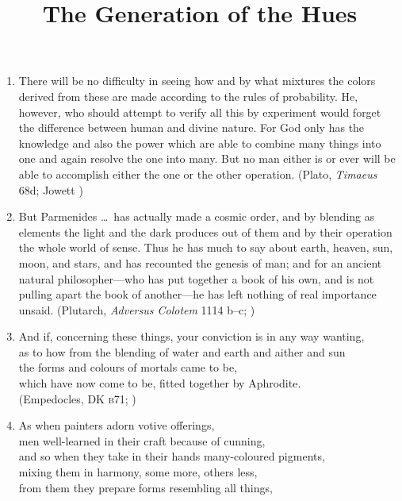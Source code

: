\documentclass[10pt]{article}
\title{The Generation of the Hues}
\author{\myauthor}
\date{} %
\begin{document}
\maketitle

\setlength{\parindent}{1em}


\begin{enumerate}
    \item There will be no difficulty in seeing how and by what mixtures the colors derived from these are made according to the rules of probability. He, however, who should attempt to verify all this by experiment would forget the difference between human and divine nature. For God only has the knowledge and also the power which are able to combine many things into one and again resolve the one into many. But no man either is or ever will be able to accomplish either the one or the other operation. (Plato, \emph{Timaeus} 68d; Jowett \citeyear[1192]{Hamilton:1961fk})
    \item But Parmenides \ldots\ has actually made a cosmic order, and by blending as elements the light and the dark produces out of them and by their operation the whole world of sense. Thus he has much to say about earth, heaven, sun, moon, and stars, and has recounted the genesis of man; and for an ancient natural philosopher---who has put together a book of his own, and is not pulling apart the book of another---he has left nothing of real importance unsaid. (Plutarch, \emph{Adversus Colotem} 1114 b--c; \citealt[231]{Einarson:1967zr})
    \item And if, concerning these things, your conviction is in any way wanting,\\
    as to how from the blending of water and earth and aither and sun\\
    the forms and colours of mortals came to be,\\
    which have now come to be, fitted together by Aphrodite.\\
    (Empedocles, DK \textsc{b}71; \citealt[74 249]{Inwood:2001ve})
    \item As when painters adorn votive offerings,\\
    men well-learned in their craft because of cunning,\\
    and so when they take in their hands many-coloured pigments,\\
    mixing them in harmony, some more, others less,\\
    from them they prepare forms resembling all things,

\end{enumerate}
\end{document}
